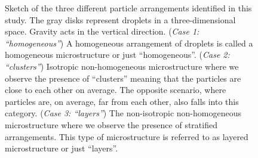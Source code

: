 \begin{figure}
\hfill
\caption{Sketch of the three different particle arrangements identified in this study.
The gray disks represent droplets in a three-dimensional space. 
Gravity acts in the vertical direction.
(\textit{Case 1: ``homogeneous''}) A homogeneous arrangement of droplets is called a homogeneous microstructure or just ``homogeneous''.
(\textit{Case 2: ``clusters''}) Isotropic non-homogeneous microstructure where we observe the presence of ``clusters'' meaning that the particles are close to each other on average.
The opposite scenario, where particles are, on average, far from each other, also falls into this category. 
(\textit{Case 3: ``layers''}) The non-isotropic non-homogeneous microstructure where we observe the presence of stratified arrangements.
This type of microstructure is referred to as layered microstructure or just ``layers''. 
}
\label{fig:scheme_clusters}
\end{figure}
